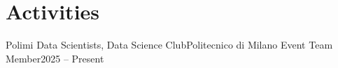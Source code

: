 \section{Activities}
\resumeSubHeadingListStart
  \resumeSubheading
    {Polimi Data Scientists, Data Science Club}{Politecnico di Milano}
    {Event Team Member}{2025 -- Present}
    \resumeItemListStart
    \resumeItemListEnd
\resumeSubHeadingListEnd
